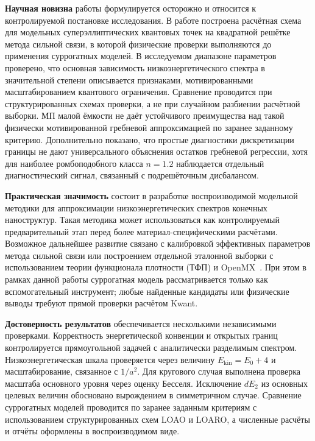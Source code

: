 \textbf{Научная новизна} работы формулируется осторожно и относится к контролируемой
постановке исследования. В работе построена расчётная схема для модельных
суперэллиптических квантовых точек на квадратной решётке метода сильной связи, в которой
физические проверки выполняются до применения суррогатных моделей. В исследуемом диапазоне
параметров проверено, что основная зависимость низкоэнергетического спектра в значительной
степени описывается признаками, мотивированными масштабированием квантового ограничения.
Сравнение проводится при структурированных схемах проверки, а не при случайном разбиении
расчётной выборки. МП малой ёмкости не даёт устойчивого преимущества над такой физически
мотивированной гребневой аппроксимацией по заранее заданному критерию. Дополнительно
показано, что простые диагностики дискретизации границы не дают универсального объяснения
остатков гребневой регрессии, хотя для наиболее ромбоподобного класса $n=1.2$ наблюдается
отдельный диагностический сигнал, связанный с подрешёточным дисбалансом.

\textbf{Практическая значимость} состоит в разработке воспроизводимой модельной методики
для аппроксимации низкоэнергетических спектров конечных наноструктур. Такая методика может
использоваться как контролируемый предварительный этап перед более материал-специфическими
расчётами. Возможное дальнейшее развитие связано с калибровкой эффективных параметров
метода сильной связи или построением отдельной эталонной выборки с использованием теории
функционала плотности (ТФП) и
OpenMX~\cite{hohenberg1964inhomogeneous,kohn1965selfconsistent,ozaki2003openmx}. При этом
в рамках данной работы суррогатная модель рассматривается только как вспомогательный
инструмент; любые найденные кандидаты или физические выводы требуют прямой проверки
расчётом Kwant.

\textbf{Достоверность результатов} обеспечивается несколькими независимыми проверками.
Корректность энергетической конвенции и открытых границ контролируется прямоугольной
задачей с аналитически разделимым спектром. Низкоэнергетическая шкала проверяется через
величину $E_{\mathrm{kin}}=E_0+4$ и масштабирование, связанное с $1/a^2$. Для кругового
случая выполнена проверка масштаба основного уровня через оценку Бесселя. Исключение
$dE_2$ из основных целевых величин обосновано вырождением в симметричном случае. Сравнение
суррогатных моделей проводится по заранее заданным критериям с использованием
структурированных схем LOAO и LOARO, а численные расчёты и отчёты оформлены в
воспроизводимом виде.

